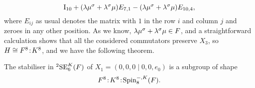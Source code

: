 \begin{equation}
\mathord{\mathrm{I}}_{10} + (\lambda \mu^{\sigma} + \lambda^{\sigma}\mu)E_{7,1} 
- (\lambda \mu^{\sigma} + \lambda^{\sigma}\mu) E_{10,4},
\end{equation}
where 
$E_{i j}$ as usual denotes the matrix with $1$ in the row $i$
and column $j$ and zeroes in any other position. As we know,
$\lambda \mu^{\sigma} + \lambda^{\sigma}\mu \in F$, and a straightforward
calculation shows that all the considered commutators preserve
$X_3$, so $H \cong F^8\mathord{{\;\!{:}\;\!}} K^8$, and we have the following theorem.
\begin{theorem}
	\label{theorem:2_type1_stabiliser}
	The stabiliser in ${}^2\mathrm{SE}_6^K(F)$ of 
	$X_1 = (0,0,0\mid 0,0,e_0)$ 
	is a subgroup of shape
	\begin{equation}
		F^{8}\mathord{{\;\!{:}\;\!}} K^{8}\mathord{{\;\!{:}\;\!}}\mathrm{Spin}_{8}^{-,K}(F).
	\end{equation}
\end{theorem}


%			
%			
%			
%

